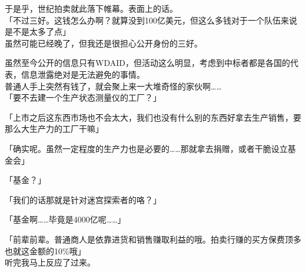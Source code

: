 于是乎，世纪拍卖就此落下帷幕。表面上的话。\\

「不过三好。这钱怎么办啊？就算没到100亿美元，但这么多钱对于一个队伍来说是不是太多了点」\\

虽然可能已经晚了，但我还是很担心公开身份的三好。

虽然至今公开的信息只有WDAID，但活动这么明显，考虑到中标者都是各国的代表，信息泄露绝对是无法避免的事情。\\

普通人手上突然有钱了，就会聚上来一大堆奇怪的家伙啊……\\

「要不去建一个生产状态测量仪的工厂？」

「上市之后这东西市场也不会太大，我们也没有什么别的东西好拿去生产销售，要那么大生产力的工厂干嘛」

「确实呢。虽然一定程度的生产力也是必要的……那就拿去捐赠，或者干脆设立基金会」

「基金？」

「我们的话那就是针对迷宫探索者的咯？」

「基金啊……毕竟是4000亿呢……」

「前辈前辈。普通商人是依靠进货和销售赚取利益的哦。拍卖行赚的买方保费顶多也就这金额的10\%哦」\\

听完我马上反应了过来。

